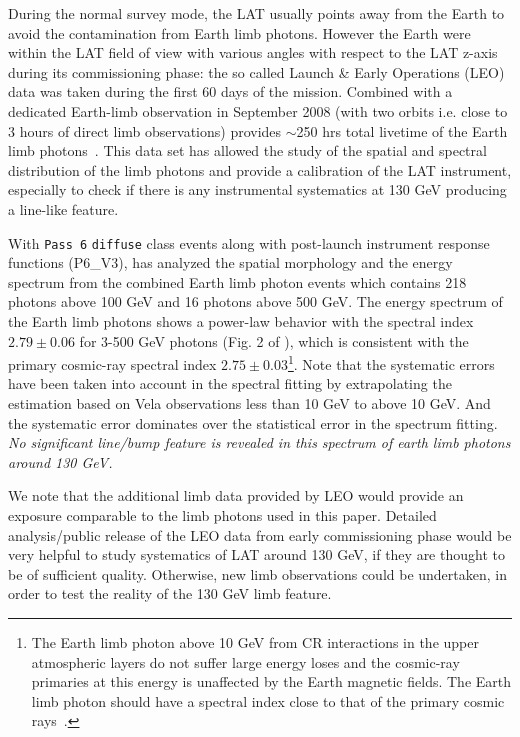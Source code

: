 \documentclass[aps,twocolumn,prd,superscriptaddress,showpacs,nofootinbib,fixfloat]{revtex4}
\begin{document}
During the normal survey mode, the LAT usually points away
from the Earth to avoid the contamination from Earth limb
photons. However the Earth were within the LAT field of view
with various angles with respect to the LAT z-axis during
its commissioning phase: the so called Launch \& Early
Operations (LEO) data was taken during the first 60 days of
the mission. Combined with a dedicated Earth-limb
observation in September 2008 (with two orbits i.e. close to
3 hours of direct limb observations) provides $\sim$250 hrs
total livetime of the Earth limb
photons~\cite{FermiLimb}. This data set has allowed the
study of the spatial and spectral distribution of the limb
photons and provide a calibration of the LAT instrument,
especially to check if there is any instrumental systematics
at 130 GeV producing a line-like feature.

With \texttt{Pass 6} \texttt{diffuse} class events along with
post-launch instrument response functions (P6\_V3),
\cite{FermiLimb} has analyzed the spatial morphology and the
energy spectrum from the combined Earth limb photon events
which contains 218 photons above 100 GeV and 16 photons
above 500 GeV. The energy spectrum of the Earth limb photons
shows a power-law behavior with the spectral index $2.79\pm
0.06$ for 3-500 GeV photons (Fig. 2 of \cite{FermiLimb}),
which is consistent with the primary cosmic-ray spectral
index $2.75\pm 0.03$\footnote{The Earth limb photon above 10
  GeV from CR interactions in the upper atmospheric
  layers do not suffer large energy loses and the cosmic-ray
  primaries at this energy is unaffected by the Earth
  magnetic fields. The Earth limb photon should have a
  spectral index close to that of the primary cosmic
  rays~\cite{FermiLimb}. }. Note that the systematic errors
have been taken into account in the spectral fitting by
extrapolating the estimation based on Vela observations less
than 10 GeV to above 10 GeV. And the systematic error
dominates over the statistical error in the spectrum
fitting. \emph{No significant line/bump feature is revealed
  in this spectrum of earth limb photons around 130 GeV.}

We note that the additional limb data provided by LEO would
provide an exposure comparable to the limb photons used in
this paper. Detailed analysis/public release of the LEO data
from early commissioning phase would be very helpful to
study systematics of LAT around 130 GeV, if they are thought
to be of sufficient quality.  Otherwise, new limb
observations could be undertaken, in order to test the
reality of the 130 GeV limb feature.
\end{document}
